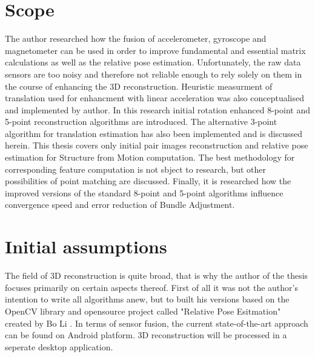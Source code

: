 \section{Scope}
The author researched how the fusion of accelerometer, gyroscope and magnetometer can be used in order to improve fundamental and essential matrix calculations as well as the relative pose estimation. Unfortunately, the raw data sensors are too noisy and therefore not reliable enough to rely solely on them in the course of enhancing the 3D reconstruction. Heuristic measurment of translation used for enhancment with linear acceleration was also conceptualised and implemented by author. In this research initial rotation enhanced 8-point and 5-point reconstruction algorithms are introduced. The alternative 3-point algorithm for translation estimation has also been implemented and is discussed herein.
This thesis covers only initial pair images reconstruction and relative pose estimation for Structure from Motion computation. The best methodology for corresponding feature computation is not sbject to research, but other possibilities of point matching are discussed. Finally, it is researched how the improved versions of the standard 8-point and 5-point algorithms influence convergence speed and error reduction of Bundle Adjustment.
\section{Initial assumptions}
The field of 3D reconstruction is quite broad, that is why the author of the thesis focuses primarily on certain aspects thereof. First of all it was not the author's intention to write all algorithms anew, but to built his versions based on the OpenCV library and opensource project called "Relative Pose Esitmation" created by Bo Li \cite{website:relativePoseLibrary}. In terms of sensor fusion, the current state-of-the-art approach can be found on Android platform. 3D reconstruction will be processed in a seperate desktop application.
